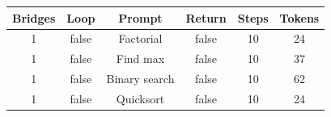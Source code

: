 \begin{table}[h]
\centering
\begin{tabular}{ |c|c|c|c|c|c| }
\hline
Bridges & Loop & Prompt & Return & Steps & Tokens \\
\hline
1 & false & Factorial & false & 10 & 24 \\
\hline
1 & false & Find max & false & 10 & 37 \\
\hline
1 & false & Binary search & false & 10 & 62 \\
\hline
1 & false & Quicksort & false & 10 & 24 \\
\hline
\end{tabular}
\end{table}
